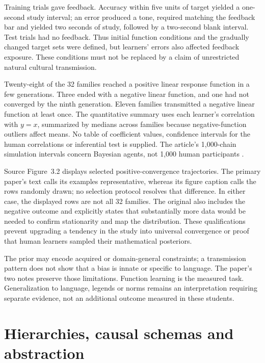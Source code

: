 Training trials gave feedback. Accuracy within five units of target
yielded a one-second study interval; an error produced a tone, required
matching the feedback bar and yielded two seconds of study, followed
by a two-second blank interval. Test trials had no feedback. Thus initial
function conditions and the gradually changed target sets were defined,
but learners' errors also affected feedback exposure. These conditions
must not be replaced by a claim of unrestricted natural cultural transmission.

Twenty-eight of the 32 families reached a positive linear response
function in a few generations. Three ended with a negative linear function,
and one had not converged by the ninth generation. Eleven families
transmitted a negative linear function at least once. The quantitative
summary uses each learner's correlation with \(y=x\), summarized by
medians across families because negative-function outliers affect means.
No table of coefficient values, confidence intervals for the human
correlations or inferential test is supplied. The article's 1,000-chain
simulation intervals concern Bayesian agents, not 1,000 human participants
\cite[pp.~291--292, fig.~3]{KalishGriffithsLewandowsky2007Iterated}.

Source Figure~3.2 displays selected positive-convergence trajectories.
The primary paper's text calls its examples representative, whereas its
figure caption calls the rows randomly drawn; no selection protocol resolves
that difference. In either case, the displayed rows are not all 32 families.
The original also includes the negative outcome and explicitly states
that substantially more data would be needed to confirm stationarity and
map the distribution. These qualifications prevent upgrading a tendency
in the study into universal convergence or proof that human learners
sampled their mathematical posteriors.

The prior may encode acquired or domain-general constraints; a transmission
pattern does not show that a bias is innate or specific to language.
The paper's two notes preserve those limitations. Function learning is
the measured task. Generalization to language, legends or norms remains
an interpretation requiring separate evidence, not an additional outcome
measured in these students.

\section{Hierarchies, causal schemas and abstraction}
\label{sec:p19-bci-hierarchies}

